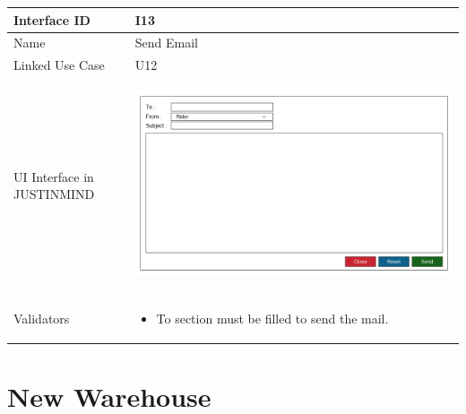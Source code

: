 \documentclass[12pt,a4paper]{report}
\begin{document}
\begin{tabular}{ | m{3cm} | m{12cm}| } \hline

Interface ID & I13  \\\hline

Name  &  Send Email \\ \hline

Linked Use Case & U12 \\ \hline

UI Interface in JUSTINMIND & \begin{center} \includegraphics[scale=0.3]{./UIs for Latex Reports/UI-013 SendEmail@1x.png}\end{center}  \\ \hline

Validators & 
\begin{itemize}
\item  To section must be filled to send the mail.



\end{itemize}
\\ \hline

\end{tabular} 
\section{New Warehouse}
\end{document}
